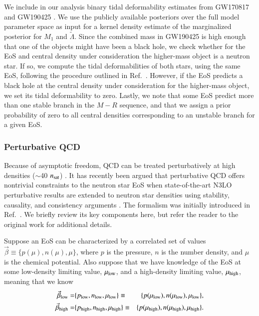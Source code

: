 \documentclass[aps,prd,nofootinbib,tightenlines,notitlepage,floatfix,superscriptaddress,showkeys,twocolumn]{revtex4-1}
\begin{document}
We include in our analysis binary tidal deformability estimates from GW170817 \cite{LIGOScientific:2017vwq,De:2018uhw,LIGOScientific:2018cki} and GW190425 \cite{LIGOScientific:2020aai}. We use the publicly available posteriors over the full model parameter space \cite{170817data,190425data} as input for a kernel density estimate of the marginalized posterior for $M_1$ and $\tilde{\Lambda}$. Since the combined mass in GW190425 is high enough that one of the objects might have been a black hole, we check whether for the EoS and central density under consideration the higher-mass object is a neutron star. If so, we compute the tidal deformabilities of both stars, using the same EoS, following the procedure outlined in Ref.~\cite{hinderer2008tidal, hinderer2009erratum}. However, if the EoS predicts a black hole at the central density under consideration for the higher-mass object, we set its tidal deformability to zero. 
Lastly, we note that some EoS predict more than one stable branch in the $M-R$ sequence, and that we assign a prior probability of zero to all central densities corresponding to an unstable branch for a given EoS. 


\subsubsection{Perturbative QCD}\label{subsec:pqcd_input}

Because of asymptotic freedom, QCD can be treated perturbatively at high densities ($\sim$40 $n_{\rm sat}$) \cite{Andersen:2002jz}. It has recently been argued that perturbative QCD offers nontrivial constraints to the neutron star EoS when state-of-the-art N3LO perturbative results \cite{Gorda:2021znl,Gorda:2021kme} are extended to neutron star densities using stability, causality, and consistency arguments \cite{Gorda:2022jvk,Komoltsev:2021jzg}. The formalism was initially introduced in Ref.~\cite{Komoltsev:2021jzg}. We briefly review its key components here, but refer the reader to the original work for additional details. 

Suppose an EoS can be characterized by a correlated set of values $\vec{\beta} \equiv \{p(\mu),n(\mu),\mu\}$, where $p$ is the pressure, $n$ is the number density, and $\mu$ is the chemical potential. Also suppose that we have knowledge of the EoS at some low-density limiting value, $\mu_{\rm low}$, and a high-density limiting value, $\mu_{\rm high}$, meaning that we know
\begin{eqnarray}
   \vec{\beta}_{\rm low} = & \{p_{\rm low},n_{\rm low},\mu_{\rm low}\}  \equiv &\{p(\mu_{\rm low}),n(\mu_{\rm low}),\mu_{\rm low}\}, \label{eq:betalow}\\
    \vec{\beta}_{\rm high} = & \{p_{\rm high},n_{\rm high},\mu_{\rm high}\} \equiv &\{p(\mu_{\rm high}),n(\mu_{\rm high}),\mu_{\rm high}\}. \label{eq:betahigh}
\end{eqnarray}
\end{document}
